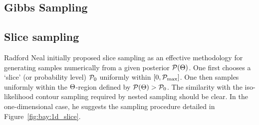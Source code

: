 \subsection{Gibbs Sampling}


\subsection{Slice sampling}
\label{sec:sm:slice}
Radford Neal initially proposed slice sampling as an effective methodology for generating samples numerically from a given posterior $\mathcal{P}(\Theta)$. One first chooses a `slice' (or probability level) $\mathcal{P}_0$ uniformly within $[0,\mathcal{P}_{\mathrm{max}}]$. One then samples uniformly within the $\Theta$-region defined by $\mathcal{P}(\Theta)>\mathcal{P}_0$. The similarity with the iso-likelihood contour sampling required by nested sampling should be clear. In the one-dimensional case, he suggests the sampling procedure detailed in Figure~\ref{fig:bay:1d_slice}.

